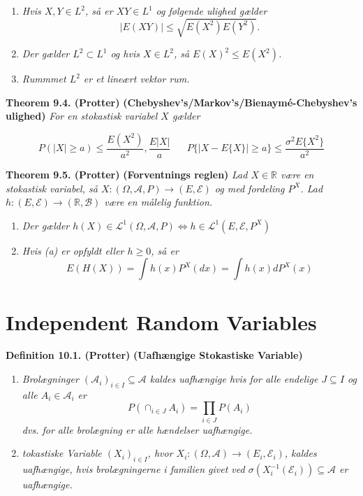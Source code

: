\documentclass[
]{book}
\providecommand{\tightlist}{%
  \setlength{\itemsep}{0pt}\setlength{\parskip}{0pt}}
\begin{document}
\begin{enumerate}
\def\labelenumi{\alph{enumi}.}
\tightlist
\item
  \emph{Hvis \(X,Y\in L^2\), så er \(XY\in L^1\) og følgende ulighed gælder}
  \[
    \vert E(XY)\vert \le \sqrt{E(X^2)E(Y^2)}.
    \]
\item
  \emph{Der gælder \(L^2\subset L^1\) og hvis \(X\in L^2\), så \(E(X)^2\le E(X^2)\).}
\item
  \emph{Rummmet \(L^2\) er et lineært vektor rum.}
\end{enumerate}

\textbf{Theorem 9.4. (Protter)} \textbf{(Chebyshev's/Markov's/Bienaymé-Chebyshev's ulighed)} \emph{For en stokastisk variabel \(X\) gælder}

\[
P(\vert X\vert \ge a)\le \frac{E(X^2)}{a^2},\frac{E\vert X\vert}{a} \hspace{20pt} P\{\vert X-E\{X\}\vert\ge a\}\le \frac{\sigma^2 E\{X^2\}}{a^2}
\]

\textbf{Theorem 9.5. (Protter)} \textbf{(Forventnings reglen)} \emph{Lad \(X\in \mathbb{R}\) være en stokastisk variabel, så \(X : (\Omega, \mathcal{A}, P)\to (E,\mathcal{E})\) og med fordeling \(P^X\). Lad \(h : (E,\mathcal{E})\to(\mathbb{R},\mathcal{B})\) være en målelig funktion.}

\begin{enumerate}
\def\labelenumi{\alph{enumi}.}
\tightlist
\item
  \emph{Der gælder \(h(X)\in\mathcal{L}^1(\Omega, \mathcal{A}, P)\iff h\in\mathcal{L}^1(E, \mathcal{E}, P^X)\)}
\item
  \emph{Hvis (a) er opfyldt eller \(h\ge 0\), så er}
  \[
    E(H(X))=\int h(x)P^X(dx)=\int h(x)dP^X(x)
    \]
\end{enumerate}

\hypertarget{independent-random-variables}{%
\section{Independent Random Variables}\label{independent-random-variables}}

\textbf{Definition 10.1. (Protter)} \textbf{(Uafhængige Stokastiske Variable)}

\begin{enumerate}
\def\labelenumi{\alph{enumi}.}
\tightlist
\item
  \emph{Brolægninger \((\mathcal{A}_i)_{i\in I}\subseteq \mathcal{A}\) kaldes uafhængige hvis for alle endelige \(J\subseteq I\) og alle \(A_i\in\mathcal{A}_i\) er}
  \[
    P(\cap_{i\in J} A_i)=\prod_{i\in J}P(A_i)
    \]
  \emph{dvs. for alle brolægning er alle hændelser uafhængige.}
\item
  \emph{tokastiske Variable \((X_i)_{i\in I}\), hvor \(X_i : (\Omega, \mathcal{A})\to (E_i,\mathcal{E}_i)\), kaldes uafhængige, hvis brolægningerne i familien givet ved \(\sigma(X_i^{-1}(\mathcal{E}_i))\subseteq \mathcal{A}\) er uafhængige.}
\end{enumerate}
\end{document}
